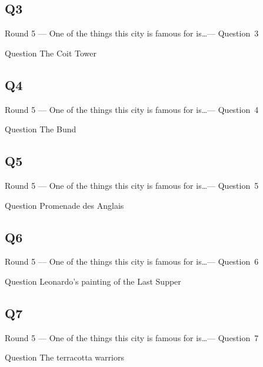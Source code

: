 \documentclass[11pt]{beamer}
\begin{document}
\subsection*{Q3}
\begin{frame}[t]{Round 5 --- One of the things this city is famous for is\ldots --- \mbox{Question 3}}
    \vspace{-0.5em}
    \begin{block}{Question}
        The Coit Tower
    \end{block}
\end{frame}
\subsection*{Q4}
\begin{frame}[t]{Round 5 --- One of the things this city is famous for is\ldots --- \mbox{Question 4}}
    \vspace{-0.5em}
    \begin{block}{Question}
        The Bund
    \end{block}
\end{frame}
\subsection*{Q5}
\begin{frame}[t]{Round 5 --- One of the things this city is famous for is\ldots --- \mbox{Question 5}}
    \vspace{-0.5em}
    \begin{block}{Question}
        Promenade des Anglais
    \end{block}
\end{frame}
\subsection*{Q6}
\begin{frame}[t]{Round 5 --- One of the things this city is famous for is\ldots --- \mbox{Question 6}}
    \vspace{-0.5em}
    \begin{block}{Question}
        Leonardo's painting of the Last Supper
    \end{block}
\end{frame}
\subsection*{Q7}
\begin{frame}[t]{Round 5 --- One of the things this city is famous for is\ldots --- \mbox{Question 7}}
    \vspace{-0.5em}
    \begin{block}{Question}
        The terracotta warriors
    \end{block}
\end{frame}
\end{document}
